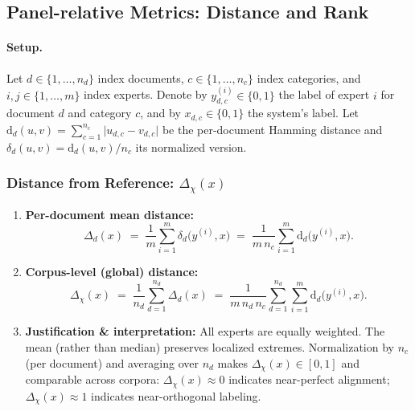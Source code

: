 \documentclass[12pt]{article}
\begin{document}
\subsection{Panel-relative Metrics: Distance and Rank}

\paragraph{Setup.}
Let $d\in\{1,\dots,n_d\}$ index documents, $c\in\{1,\dots,n_c\}$ index categories, and $i,j\in\{1,\dots,m\}$ index experts.
Denote by $y^{(i)}_{d,c}\in\{0,1\}$ the label of expert $i$ for document $d$ and category $c$, and by $x_{d,c}\in\{0,1\}$ the system's label.
Let $\mathrm{d}_d(u,v)=\sum_{c=1}^{n_c}\lvert u_{d,c}-v_{d,c}\rvert$ be the per-document Hamming distance and $\delta_d(u,v)=\mathrm{d}_d(u,v)/n_c$ its normalized version.

\subsubsection{Distance from Reference: $\Delta_{\chi}(x)$}
\begin{enumerate}
\item \textbf{Per-document mean distance:}
\begin{equation}
\Delta_d(x)\;=\;\frac{1}{m}\sum_{i=1}^{m}\delta_d\!\big(y^{(i)},x\big)
\;=\;\frac{1}{m\,n_c}\sum_{i=1}^{m}\mathrm{d}_d\!\big(y^{(i)},x\big).
\label{eq:per-doc-delta-fused}
\end{equation}

\item \textbf{Corpus-level (global) distance:}
\begin{equation}
\Delta_{\chi}(x)\;=\;\frac{1}{n_d}\sum_{d=1}^{n_d}\Delta_d(x)
\;=\;\frac{1}{m\,n_d\,n_c}\sum_{d=1}^{n_d}\sum_{i=1}^{m}\mathrm{d}_d\!\big(y^{(i)},x\big).
\label{eq:global-delta-fused}
\end{equation}

\item \textbf{Justification \& interpretation:}
All experts are equally weighted. The mean (rather than median) preserves localized extremes.
Normalization by $n_c$ (per document) and averaging over $n_d$ makes $\Delta_{\chi}(x)\in[0,1]$ and comparable across corpora:
$\Delta_{\chi}(x)\approx 0$ indicates near-perfect alignment; $\Delta_{\chi}(x)\approx 1$ indicates near-orthogonal labeling.
\end{enumerate}
\end{document}
